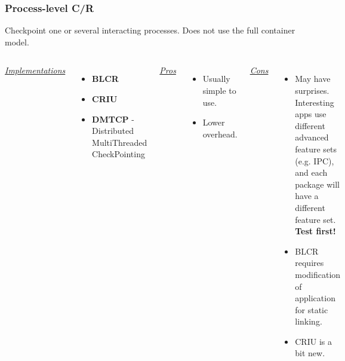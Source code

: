 \documentclass[compress]{beamer}
\begin{document}
\begin{frame}
\frametitle{Process-level C/R}

Checkpoint one or several interacting processes. Does not use the full container model.

\begin{columns}[t]
\ul{\textit{Implementations}}
\begin{itemize}
\item \textbf{BLCR}
\item \textbf{CRIU}
\item \textbf{DMTCP} - Distributed MultiThreaded CheckPointing
\end{itemize}

\ul{\textit{Pros}}
\begin{itemize}
\item Usually simple to use.
\item Lower overhead.
\end{itemize}

\ul{\textit{Cons}}
\begin{itemize}
\item May have surprises. Interesting apps use different
advanced feature sets (e.g. IPC), and each package
will have a different feature set. \textbf{Test first!}
\item BLCR requires modification of application for static linking.
\item CRIU is a bit new.
\end{itemize}

\end{columns}






\end{frame}
  
\end{document}
